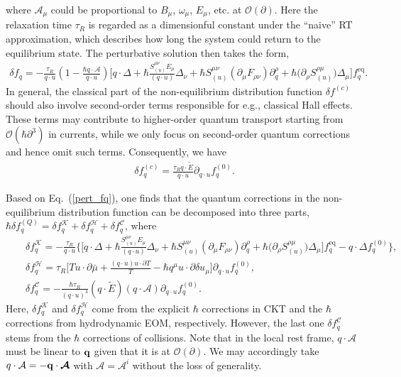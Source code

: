 \documentclass[aps,prd,showkeys,preprint,amsmath,amssymb,nofootinbib]{revtex4-1}
\begin{document}
where $\mathcal{A}_{\mu}$ could be proportional to $B_{\mu}$, $\omega_{\mu}$, $E_{\mu}$, etc. at $\mathcal{O}(\partial)$. Here the relaxation time $\tau_R$ is regarded as a dimensionful constant under the ``naive'' RT approximation, which describes how long the system
could return to the equilibrium state.
The perturbative solution then takes the form,
\begin{eqnarray}\label{pert_fq}
	\delta f_q=-\frac{\tau_R}{q\cdot u}\left(1-\frac{\hbar q\cdot\mathcal{A}}{q\cdot u}\right)\Bigg[
	q\cdot\Delta+\hbar\frac{S_{(u)}^{\mu\nu}E_{\mu}}{(q\cdot u)}\Delta_{\nu}
	+\hbar S_{(u)}^{\mu\nu}(\partial_{\mu}F_{\rho \nu})\partial^{\rho}_{q}+\hbar\big(\partial_{\rho}S^{\rho\mu}_{(u)}\big)\Delta_{\mu}\Bigg]f^\text{eq}_q.
\end{eqnarray}
In general, the classical part of the non-equilibrium distribution function $\delta f^{(c)}$ should also involve second-order terms responsible for e.g., classical Hall effects. These terms may contribute to higher-order quantum transport starting from $\mathcal{O}(\hbar\partial^3)$ in currents, while we only focus on second-order quantum corrections and hence omit such terms. Consequently, we have
\begin{eqnarray}\label{delfC}
\delta f^{(c)}_q=\frac{\tau_R q\cdot\tilde{E}}{q\cdot u}\partial_{q\cdot u}f^{(0)}_q.
\end{eqnarray}

Based on Eq.~(\ref{pert_fq}), one finds that the quantum corrections in the non-equilibrium distribution function can be decomposed into three parts,
$\hbar\delta f^{(Q)}_q=\delta f^{\mathcal{K}}_q+\delta f^{\mathcal{H}}_q+\delta f^{\mathcal{C}}_q$, where 
\begin{eqnarray}\nonumber\label{delfQ}
&&\delta f^{\mathcal{K}}_q=-\frac{\tau_R}{q\cdot u}\Bigg\{\Bigg[
q\cdot\Delta+\hbar\frac{S_{(u)}^{\mu\nu}E_{\mu}}{(q\cdot u)}\Delta_{\nu}
+\hbar S_{(u)}^{\mu\nu}(\partial_{\mu}F_{\rho \nu})\partial^{\rho}_{q}+\hbar\big(\partial_{\rho}S^{\rho\mu}_{(u)}\big)\Delta_{\mu}\Bigg]f^\text{eq}_q-q\cdot\Delta f^{(0)}_q
\Bigg\},
\\\nonumber
&&\delta f^{\mathcal{H}}_q=\tau_R\Bigg[Tu\cdot\partial\bar{\mu}+\frac{(q\cdot u) u\cdot \partial T}{T}-\hbar q^{\mu}u\cdot \partial\delta u_{\mu}\Bigg]\partial_{q\cdot u}f^{(0)}_q,
\\
&&\delta f^{\mathcal{C}}_q=-\frac{\hbar\tau_R}{(q\cdot u)^4}(q\cdot\tilde{E})(q\cdot\mathcal{A})\partial_{q\cdot u}f^{(0)}_q.
\end{eqnarray}
Here, $\delta f^{\mathcal{K}}_q$ and $\delta f^{\mathcal{H}}_q$ come from the explicit $\hbar$ corrections in CKT and the $\hbar$ corrections from hydrodynamic EOM, respectively. However, the last one $\delta f^{\mathcal{C}}_q$ stems from the $\hbar$ corrections of collisions. Note that in the local rest frame, $q\cdot\mathcal{A}$ must be linear to ${\bf q}$ given that it is at $\mathcal{O}(\partial)$. We may accordingly take $q\cdot\mathcal{A}=-{\bf q}\cdot\bm{\mathcal{A}}$ with $\bm{\mathcal{A}}=\mathcal{A}^i$ without the loss of generality. 
\end{document}

